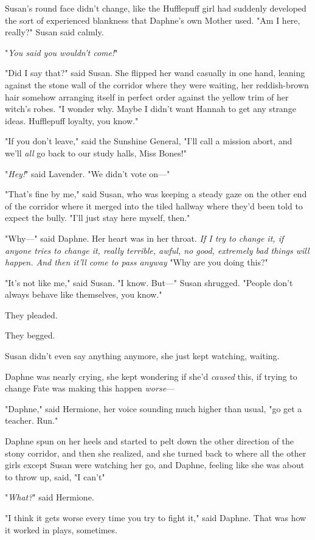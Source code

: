 Susan's round face didn't change, like the Hufflepuff girl had suddenly
developed the sort of experienced blankness that Daphne's own Mother used. "Am
I here, really?" Susan said calmly.

"\emph{You said you wouldn't come!}"

"Did I say that?" said Susan. She flipped her wand casually in one hand,
leaning against the stone wall of the corridor where they were waiting, her
reddish-brown hair somehow arranging itself in perfect order against the yellow
trim of her witch's robes. "I wonder why. Maybe I didn't want Hannah to get any
strange ideas. Hufflepuff loyalty, you know."

"If you don't leave," said the Sunshine General, "I'll call a mission abort,
and we'll \emph{all} go back to our study halls, Miss Bones!"

"\emph{Hey!}" said Lavender. "We didn't vote on—"

"That's fine by me," said Susan, who was keeping a steady gaze on the other end
of the corridor where it merged into the tiled hallway where they'd been told
to expect the bully. "I'll just stay here myself, then."

"Why—" said Daphne. Her heart was in her throat. \emph{If I try to change it,
if \emph{anyone} tries to change it, really terrible, awful, no good, extremely
bad things will happen. And then it'll come to pass anyway{\el}} "Why are
you doing this?"

"It's not like me," said Susan. "I know. But—" Susan shrugged. "People don't
always behave like themselves, you know."

They pleaded.

They begged.

Susan didn't even say anything anymore, she just kept watching, waiting.

Daphne was nearly crying, she kept wondering if she'd \emph{caused} this, if
trying to change Fate was making this happen \emph{worse}—

"Daphne," said Hermione, her voice sounding much higher than usual, "go get a
teacher. Run."

Daphne spun on her heels and started to pelt down the other direction of the
stony corridor, and then she realized, and she turned back to where all the
other girls except Susan were watching her go, and Daphne, feeling like she was
about to throw up, said, "I can't{\el}"

"\emph{What?}" said Hermione.

"I think it gets worse every time you try to fight it," said Daphne. That was
how it worked in plays, sometimes.

